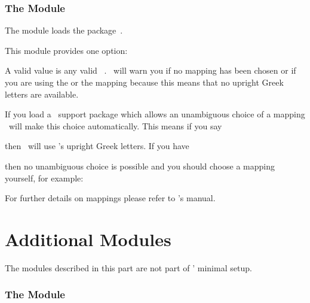 \documentclass{chemmacros-manual}
\begin{document}
\section{The  Module}\label{sec:greek-module}

The  module loads the 
package~\cite{pkg:chemgreek}.

This module provides one option:
\begin{options}
    A valid value is any valid \chemgreek\ .  \chemmacros\ will
    warn you if no mapping has been chosen or if you are using the
     or the  mapping because this means that
    no upright Greek letters are available.
\end{options}
If you load a \chemgreek\ support package which allows an unambiguous choice
of a mapping \chemgreek\ will make this choice automatically.  This means if
you say
\begin{sourcecode}
  \usepackage{upgreek}
  \usepackage{chemmacros}
\end{sourcecode}
then \chemmacros\ will use 's upright Greek letters.  If you
have
\begin{sourcecode}
  \usepackage{upgreek}
  \usepackage{chemmacros}
  \usepackage{textgreek}
\end{sourcecode}
then no unambiguous choice is possible and you should choose a mapping
yourself, for example:
\begin{sourcecode}
  \usepackage{upgreek}
  \usepackage{chemmacros}
  \usepackage{textgreek}
\end{sourcecode}
For further details on mappings please refer to \chemgreek's manual.

\part{Additional Modules}\label{part:additional-modules}

The modules described in this part are not part of \chemmacros' minimal setup.

\section{The  Module}\label{sec:isotopes-module}
\end{document}
